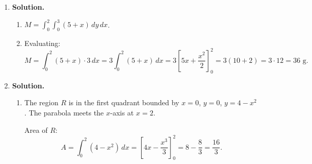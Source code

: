 \begin{enumerate}
\begin{enumerate}
(Check: area of triangle $= \frac{1}{2}\cdot 4\cdot 3 = 6$, times $\rho_0=2$ gives $12$.)

\item Center of mass:
\begin{align*}
\bar{x} &= \frac{1}{M}\int_0^4\int_0^{3x/4}2x\,dy\,dx = \frac{1}{12}\cdot 2\int_0^4 x\cdot\frac{3x}{4}\,dx\\
&= \frac{1}{12}\cdot\frac{3}{2}\int_0^4 x^2\,dx = \frac{1}{12}\cdot\frac{3}{2}\cdot\frac{64}{3} = \frac{1}{12}\cdot 32 = \frac{8}{3}.
\end{align*}

\begin{align*}
\bar{y} &= \frac{1}{M}\int_0^4\int_0^{3x/4}2y\,dy\,dx = \frac{1}{12}\cdot 2\int_0^4\frac{1}{2}\left(\frac{3x}{4}\right)^2 dx\\
&= \frac{1}{12}\int_0^4\frac{9x^2}{16}\,dx = \frac{1}{12}\cdot\frac{9}{16}\cdot\frac{64}{3} = \frac{1}{12}\cdot 12 = 1.
\end{align*}

So $(\bar{x},\bar{y}) = \boxed{\left(\frac{8}{3}, 1\right)}$.

\item Since $\bar{x} = 8/3 \approx 2.67 > 2$ (more than halfway along the $x$-base of length 4), this is because the triangle widens as $x$ increases: the height at position $x$ is $3x/4$, which grows linearly with $x$. Thus more area (and hence more mass, since density is uniform) is concentrated toward larger $x$-values, pulling the centroid past the midpoint.
\end{enumerate}

\item \textbf{Solution.}
\begin{enumerate}
\item $\displaystyle M = \int_0^2\int_0^3(5+x)\,dy\,dx$.

\item Evaluating:
\[
M = \int_0^2(5+x)\cdot 3\,dx = 3\int_0^2(5+x)\,dx = 3\left[5x+\frac{x^2}{2}\right]_0^2 = 3\left(10+2\right) = 3\cdot 12 = \boxed{36\text{ g}}.
\]
\end{enumerate}

\item \textbf{Solution.}
\begin{enumerate}
\item The region $R$ is in the first quadrant bounded by $x=0$, $y=0$, $y=4-x^2$. The parabola meets the $x$-axis at $x=2$.

Area of $R$:
\[
A = \int_0^2(4-x^2)\,dx = \left[4x-\frac{x^3}{3}\right]_0^2 = 8-\frac{8}{3} = \frac{16}{3}.
\]


\end{enumerate}
\end{enumerate}
